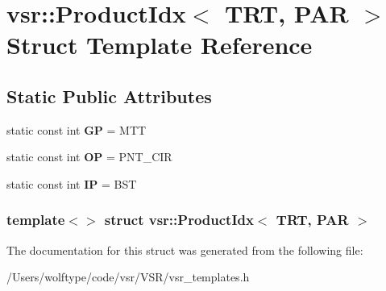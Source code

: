 \hypertarget{structvsr_1_1_product_idx_3_01_t_r_t_00_01_p_a_r_01_4}{\section{vsr\-:\-:Product\-Idx$<$ T\-R\-T, P\-A\-R $>$ Struct Template Reference}
\label{structvsr_1_1_product_idx_3_01_t_r_t_00_01_p_a_r_01_4}
}
\subsection*{Static Public Attributes}
\begin{DoxyCompactItemize}
\item 
\hypertarget{structvsr_1_1_product_idx_3_01_t_r_t_00_01_p_a_r_01_4_ac3a1e38584964524809250ac831daf78}{static const int {\bfseries G\-P} = M\-T\-T}\label{structvsr_1_1_product_idx_3_01_t_r_t_00_01_p_a_r_01_4_ac3a1e38584964524809250ac831daf78}

\item 
\hypertarget{structvsr_1_1_product_idx_3_01_t_r_t_00_01_p_a_r_01_4_a98db0f90471d775eb6b094774ab88a9e}{static const int {\bfseries O\-P} = P\-N\-T\-\_\-\-C\-I\-R}\label{structvsr_1_1_product_idx_3_01_t_r_t_00_01_p_a_r_01_4_a98db0f90471d775eb6b094774ab88a9e}

\item 
\hypertarget{structvsr_1_1_product_idx_3_01_t_r_t_00_01_p_a_r_01_4_a8071a997eaf007caba31e65a54f31b59}{static const int {\bfseries I\-P} = B\-S\-T}\label{structvsr_1_1_product_idx_3_01_t_r_t_00_01_p_a_r_01_4_a8071a997eaf007caba31e65a54f31b59}

\end{DoxyCompactItemize}
\subsubsection*{template$<$$>$ struct vsr\-::\-Product\-Idx$<$ T\-R\-T, P\-A\-R $>$}



The documentation for this struct was generated from the following file\-:\begin{DoxyCompactItemize}
\item 
/\-Users/wolftype/code/vsr/\-V\-S\-R/vsr\-\_\-templates.\-h\end{DoxyCompactItemize}
